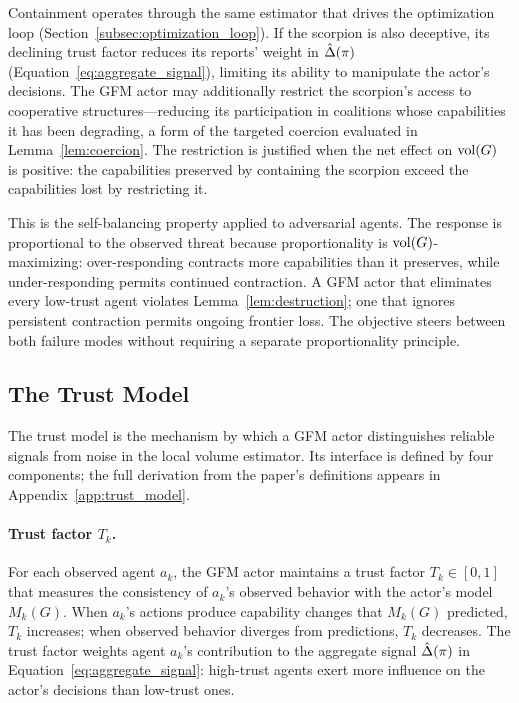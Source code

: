 Containment operates through the same estimator that drives the optimization
loop (Section~\ref{subsec:optimization_loop}). If the scorpion is also
deceptive, its declining trust factor reduces its reports' weight in
$\hat{\Delta}(\pi)$ (Equation~\eqref{eq:aggregate_signal}), limiting its ability
to manipulate the actor's decisions. The GFM actor may additionally restrict
the scorpion's access to cooperative structures---reducing its participation in
coalitions whose capabilities it has been degrading, a form of the targeted
coercion evaluated in Lemma~\ref{lem:coercion}. The restriction is justified
when the net effect on $\operatorname{vol}(G)$ is positive: the capabilities preserved by
containing the scorpion exceed the capabilities lost by restricting it.

This is the self-balancing property applied to adversarial agents. The response
is proportional to the observed threat because proportionality is
$\operatorname{vol}(G)$-maximizing: over-responding contracts more capabilities than it
preserves, while under-responding permits continued contraction. A GFM actor
that eliminates every low-trust agent violates Lemma~\ref{lem:destruction}; one
that ignores persistent contraction permits ongoing frontier loss. The
objective steers between both failure modes without requiring a separate
proportionality principle.

\subsection{The Trust Model}
\label{subsec:trust_model}

The trust model is the mechanism by which a GFM actor distinguishes reliable
signals from noise in the local volume estimator. Its interface is defined by
four components; the full derivation from the paper's definitions appears in
Appendix~\ref{app:trust_model}.

\paragraph{Trust factor $T_k$.} For each observed agent $a_k$, the GFM actor
maintains a trust factor $T_k \in [0, 1]$ that measures the consistency of
$a_k$'s observed behavior with the actor's model $M_k(G)$. When $a_k$'s actions
produce capability changes that $M_k(G)$ predicted, $T_k$ increases; when
observed behavior diverges from predictions, $T_k$ decreases. The trust factor
weights agent $a_k$'s contribution to the aggregate signal $\hat{\Delta}(\pi)$ in
Equation~\eqref{eq:aggregate_signal}: high-trust agents exert more influence on
the actor's decisions than low-trust ones.

